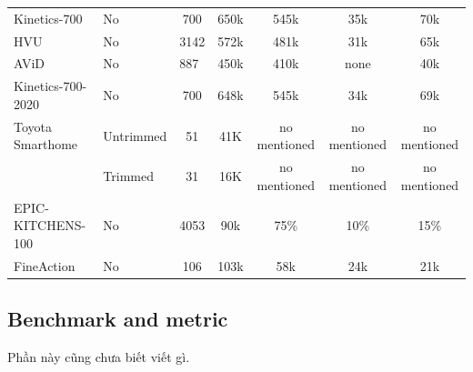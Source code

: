 \documentclass[a4paper]{article}
\begin{document}
\begin{table}[h]
\begin{tabular}{l|l|c c c c c}
		Kinetics-700            & No            & 700      & 650k         & 545k           & 35k          & 70k   \\
		HVU                     & No            & 3142     & 572k         & 481k           & 31k          & 65k      \\
		AViD                    & No            & 887      & 450k         & 410k           & none         & 40k      \\
		Kinetics-700-2020       & No            & 700      & 648k         & 545k           & 34k          & 69k        \\
		Toyota Smarthome        & Untrimmed     & 51       & 41K          & no mentioned   & no mentioned & no mentioned        \\
		                        & Trimmed       & 31       & 16K          & no mentioned   & no mentioned & no mentioned \\
		EPIC-KITCHENS-100       & No            & 4053     & 90k          & 75\%           & 10\%         & 15\%         \\	
		FineAction              & No            & 106      & 103k         & 58k            & 24k          & 21k         \\
		\bottomrule
		
	\end{tabular}%
	\label{DataStatistic}
\end{table}%

\subsection{Benchmark and metric}

Phần này cũng chưa biết viết gì.
\end{document}
